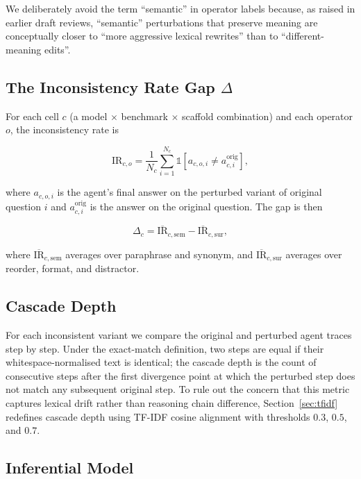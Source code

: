 \documentclass[11pt]{article}
\begin{document}
We deliberately avoid the term ``semantic'' in operator labels because, as raised in earlier draft reviews, ``semantic'' perturbations that preserve meaning are conceptually closer to ``more aggressive lexical rewrites'' than to ``different-meaning edits''.

\subsection{The Inconsistency Rate Gap $\Delta$}

For each cell $c$ (a model $\times$ benchmark $\times$ scaffold combination) and each operator $o$, the inconsistency rate is

\begin{equation}
\mathrm{IR}_{c,o} = \frac{1}{N_c} \sum_{i=1}^{N_c} \mathbb{1}\!\left[a_{c,o,i} \neq a^{\mathrm{orig}}_{c,i}\right],
\label{eq:ir}
\end{equation}

where $a_{c,o,i}$ is the agent's final answer on the perturbed variant of original question $i$ and $a^{\mathrm{orig}}_{c,i}$ is the answer on the original question. The gap is then

\begin{equation}
\Delta_c = \overline{\mathrm{IR}}_{c,\mathrm{sem}} - \overline{\mathrm{IR}}_{c,\mathrm{sur}},
\label{eq:delta}
\end{equation}

where $\overline{\mathrm{IR}}_{c,\mathrm{sem}}$ averages over paraphrase and synonym, and $\overline{\mathrm{IR}}_{c,\mathrm{sur}}$ averages over reorder, format, and distractor.

\subsection{Cascade Depth}

For each inconsistent variant we compare the original and perturbed agent traces step by step. Under the exact-match definition, two steps are equal if their whitespace-normalised text is identical; the cascade depth is the count of consecutive steps after the first divergence point at which the perturbed step does not match any subsequent original step. To rule out the concern that this metric captures lexical drift rather than reasoning chain difference, Section~\ref{sec:tfidf} redefines cascade depth using TF-IDF cosine alignment with thresholds $0.3$, $0.5$, and $0.7$.

\subsection{Inferential Model}
\end{document}

